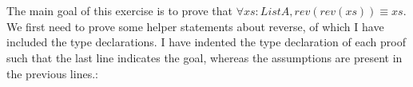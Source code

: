 \documentclass[12pt,twoside,notitlepage]{report}
\begin{document}
\begin{code}
\\
\> \AgdaSymbol{:} \AgdaSymbol{\{} \AgdaSymbol{:} \AgdaSymbol{\}}  \AgdaSymbol{(} \AgdaSymbol{)}  \AgdaSymbol{(} \AgdaSymbol{)}   \<%
\\
\> \AgdaInductiveConstructor{[]}  \AgdaSymbol{=} \<%
\\
\> \AgdaSymbol{(}  \AgdaSymbol{)}  \AgdaSymbol{=}   \AgdaSymbol{(}  \AgdaSymbol{)}\<%
\\
%
\\
\> \AgdaSymbol{:} \AgdaSymbol{\{} \AgdaSymbol{:} \AgdaSymbol{\}}      \<%
\\
\>  \AgdaSymbol{=}   \AgdaInductiveConstructor{[]}\<%
\\
\end{code}

The main goal of this exercise is to prove that $\forall xs : List A, rev (rev (xs)) \equiv xs$. We first need to prove some helper statements about reverse, of which I have included the type declarations. I have indented the type declaration of each proof such that the last line indicates the goal, whereas the assumptions are present in the previous lines.:

\begin{code}
\\
\> \AgdaSymbol{:}  \AgdaSymbol{\{}\AgdaSymbol{\}}\<%
\\
\>[0]\<[10]%
\>[10] \AgdaSymbol{(} \AgdaSymbol{:}  \AgdaSymbol{)}\<%
\\
\>[0]\<[10]%
\>[10] \AgdaSymbol{(} \AgdaSymbol{:}  \AgdaSymbol{)}\<%
\\
\>[0]\<[10]%
\>[10]     \AgdaSymbol{(} \AgdaSymbol{)} \AgdaFunction{++} \<%
\\
\end{code}
\end{document}
